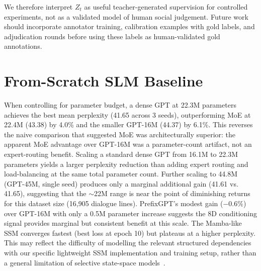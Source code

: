 \documentclass[11pt]{article}
\begin{document}
We therefore interpret $Z_t$ as useful teacher-generated supervision for controlled experiments, not as a validated model of human social judgement.
Future work should incorporate annotator training, calibration examples with gold labels, and adjudication rounds before using these labels as human-validated gold annotations.

\section{From-Scratch SLM Baseline}
\label{app:slm_baseline}

\begin{table}[t]
\centering
\caption{From-scratch SLM validation perplexity (20 epochs, 3 seeds). \textbf{Bold}: best mean. GPT-22M is param-matched to MoE at $\sim$22M.}
\label{tab:slm}
\small
{}
\end{table}

When controlling for parameter budget, a dense GPT at 22.3M parameters achieves the best mean perplexity (41.65 across 3 seeds), outperforming MoE at 22.4M (43.38) by 4.0\% and the smaller GPT-16M (44.37) by 6.1\%.
This reverses the naive comparison that suggested MoE was architecturally superior: the apparent MoE advantage over GPT-16M was a parameter-count artifact, not an expert-routing benefit.
Scaling a standard dense GPT from 16.1M to 22.3M parameters yields a larger perplexity reduction than adding expert routing and load-balancing at the same total parameter count.
Further scaling to 44.8M (GPT-45M, single seed) produces only a marginal additional gain (41.61 vs. 41.65), suggesting that the $\sim$22M range is near the point of diminishing returns for this dataset size (16,905 dialogue lines).
PrefixGPT's modest gain ($-0.6\%$) over GPT-16M with only a 0.5M parameter increase suggests the 8D conditioning signal provides marginal but consistent benefit at this scale.
The Mamba-like SSM converges fastest (best loss at epoch 10) but plateaus at a higher perplexity.
This may reflect the difficulty of modelling the relevant structured dependencies with our specific lightweight SSM implementation and training setup, rather than a general limitation of selective state-space models~\cite{gu2023mamba}.
\end{document}
